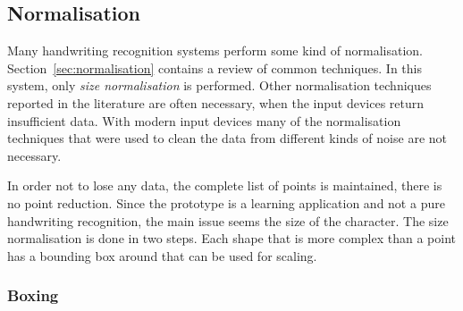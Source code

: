
\subsection{Normalisation}
\label{sec:hwre:normalisation}

Many handwriting recognition systems perform some kind of normalisation.
Section~\ref{sec:normalisation} contains a review of common techniques.
In this system, only \emph{size normalisation} is performed. Other normalisation 
techniques reported in the literature are often necessary, when the input 
devices return insufficient data. With modern input devices many of the 
normalisation techniques that were used to clean the data from different
kinds of noise are not necessary.

In order not to lose any data, the complete list of points is maintained,
there is no point reduction. Since the prototype is a learning application and 
not a pure handwriting recognition, the main issue seems the size of the 
character. The size normalisation is done in two steps. Each shape that
is more complex than a point has a bounding box around that can be used for 
scaling.

\subsubsection{Boxing}
\label{sec:hwre:boxing}

